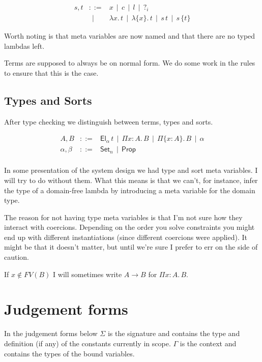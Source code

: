 \documentclass[a4paper,11pt]{article}
\newcommand\Coloneqq{\mathrel{::=}}
\newcommand\OR{~~|~~}
\newcommand\Hid[1]{\{#1\}}
\newcommand\lam[1]{\lambda#1.\,}
\newcommand\hlam[1]{\lam{\Hid{#1}}}
\newcommand\vPi[2]{\Pi#1:#2.\,}
\newcommand\vhPi[2]{\Pi\{#1:#2\}.\,}
\newcommand\Set[1]{\mathsf{Set}_{#1}}
\newcommand\Prop{\mathsf{Prop}}
\newcommand\el{\mathsf{El}}
\newcommand\El[1]{\el_{#1}\,}
\begin{document}
    \[\begin{array}{lcl}
	s,t & \Coloneqq & x \OR c \OR l \OR ?_i \\
	    & \OR & \lam xt \OR \hlam xt \OR s\,t \OR s\,\Hid t
    \end{array}\]

    Worth noting is that meta variables are now named and that there are no
    typed lambdas left.

    Terms are supposed to always be on normal form. We do some work in the
    rules to ensure that this is the case.

\subsection{Types and Sorts}

    After type checking we distinguish between terms, types and sorts.

    \[\begin{array}{lcl}
	A,B & \Coloneqq & \El\alpha t \OR \vPi xAB \OR \vhPi xAB \OR \alpha \\
	\alpha,\beta & \Coloneqq & \Set n \OR \Prop \\
    \end{array}\]

    In some presentation of the system design we had type and sort meta
    variables. I will try to do without them. What this means is that we can't,
    for instance, infer the type of a domain-free lambda by introducing a meta
    variable for the domain type.

    The reason for not having type meta variables is that I'm not sure how they
    interact with coercions.  Depending on the order you solve constraints you
    might end up with different instantiations (since different coercions were
    applied).  It might be that it doesn't matter, but until we're sure I
    prefer to err on the side of caution.

    If $x\notin\mathit{FV}(B)$ I will sometimes write $A\to B$ for $\vPi xAB$.

\section{Judgement forms}

    In the judgement forms below $\Sigma$ is the signature and contains the
    type and definition (if any) of the constants currently in scope. $\Gamma$
    is the context and contains the types of the bound variables.
\end{document}
